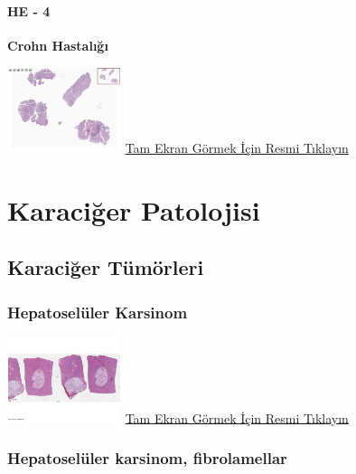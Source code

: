 \documentclass[
  letterpaper,
  DIV=11,
  numbers=noendperiod]{scrreprt}
\begin{document}
\hypertarget{he---4}{%
\subsection{HE - 4}\label{he---4}}

\textbf{Crohn Hastalığı}

\href{https://images.patolojiatlasi.com/crohn-colonoscopic-biopsy/HE4.html}{\includegraphics[width=0.25\textwidth,height=\textheight]{./screenshots/thumbnail_crohn-colonoscopic-biopsy-HE4.png}}
\href{https://images.patolojiatlasi.com/crohn-colonoscopic-biopsy/HE4.html}{Tam
Ekran Görmek İçin Resmi Tıklayın}

\part{Karaciğer Patolojisi}

\hypertarget{sec-karaciger-tumorleri}{%
\chapter{Karaciğer Tümörleri}\label{sec-karaciger-tumorleri}}

\hypertarget{sec-hepatoseluler-karsinom}{%
\section{Hepatoselüler Karsinom}\label{sec-hepatoseluler-karsinom}}

\href{https://images.patolojiatlasi.com/hepatocellularcarcinoma/HCC/viewer_z0.html}{\includegraphics[width=0.25\textwidth,height=\textheight]{./screenshots/thumbnail_hepatocellularcarcinoma.png}}
\href{https://images.patolojiatlasi.com/hepatocellularcarcinoma/HCC/viewer_z0.html}{Tam
Ekran Görmek İçin Resmi Tıklayın}

\hypertarget{sec-hepatoseluler-karsinom-fibrolamellar}{%
\section{Hepatoselüler karsinom,
fibrolamellar}\label{sec-hepatoseluler-karsinom-fibrolamellar}}
\end{document}
